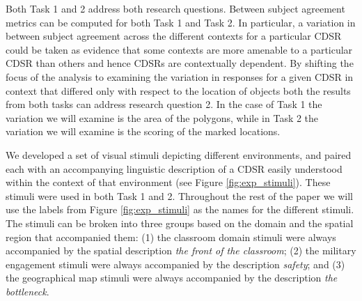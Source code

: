 \documentclass[11pt,letterpaper]{article}
\begin{document}
Both Task 1 and 2 address both research questions. Between subject agreement metrics can be computed for both Task 1 and Task 2. In particular, a variation in between subject agreement across the different contexts for a particular CDSR could be taken as evidence that some contexts are more amenable to a particular CDSR than others and hence CDSRs are contextually dependent. By shifting the focus of the analysis to examining the variation in responses for a given CDSR in context that differed only with respect to the location of objects both the results from both tasks can address research question 2. In the case of Task 1 the variation we will examine is the area of the polygons, while in Task 2 the variation we will examine is the scoring of the marked locations. 

We developed a set of visual stimuli depicting different environments, and paired each with an accompanying linguistic description of a CDSR easily understood within the context of that environment (see Figure \ref{fig:exp_stimuli}). These stimuli were used in both Task 1 and 2. Throughout the rest of the paper we will use the labels from Figure \ref{fig:exp_stimuli} as the names for the different stimuli. The stimuli can be broken into three groups based on the domain and the spatial region that accompanied them: (1) the classroom domain stimuli were always accompanied by the spatial description \emph{the front of the classroom}; (2) the military engagement stimuli were always accompanied by the description \emph{safety}; and (3) the geographical map stimuli were always accompanied by the description \emph{the bottleneck}.
\end{document}
